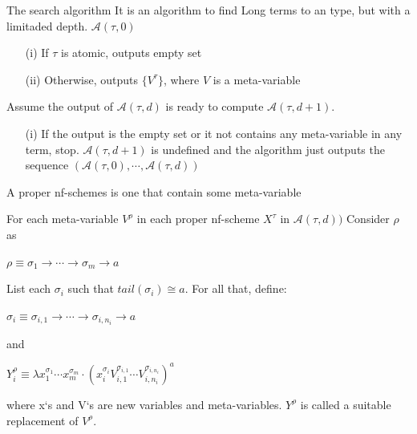 \begin{frame}{The search algorithm}
          It is an algorithm to find Long terms to an type, but with a
          limitaded depth.
          $\mathcal{A}(\tau,0)$

          \begin{itemize}
                 \item[(i)] If $\tau$ is atomic, outputs empty set

                 \item[(ii)] Otherwise, outputs $\{V^{\tau}\}$, where
                   $V$ is a meta-variable
          \end{itemize}
     
\end{frame}

\begin{frame}
          Assume the output of $\mathcal{A}(\tau,d)$ is ready to
          compute $\mathcal{A}(\tau,d+1)$.

          \begin{itemize}
                 \item[(i)] If the output is the empty set or it not
                   contains any meta-variable in any term,
                   stop. $\mathcal{A}(\tau,d+1)$ is undefined and the
                   algorithm just outputs the sequence
                   $(\mathcal{A}(\tau,0), \cdots, \mathcal{A}(\tau,d))$
          \end{itemize}
\end{frame}

\begin{frame}
      \begin{mydef}
            A proper nf-schemes is one that contain some meta-variable
      \end{mydef}

      For each meta-variable $V^{\rho}$ in each proper nf-scheme $X^{\tau}$ in
      $\mathcal{A}(\tau,d))$
      Consider $\rho$ as

      \begin{center}
            $\rho \equiv \sigma_1 \to \cdots \to \sigma_m \to a$
      \end{center}

      List each $\sigma_i$ such that $tail(\sigma_i) \cong a$. For all
      that, define:
      \begin{center}
            $\sigma_i \equiv \sigma_{i,1} \to \cdots \to \sigma_{i,n_i}
            \to a$
      \end{center}

      and
      
      \begin{center}
             $Y^{\rho}_i \equiv \lambda x^{\sigma_1}_1 \cdots
             x^{\sigma_m}_m \cdot (x^{\sigma_i}_i
             V^{\sigma_{i,1}}_{i,1} \cdots V^{\sigma_{i,n_i}}_{i,n_i})^a$
      \end{center}

      where x`s and V`s are new variables and
      meta-variables. $Y^{\rho}$ is called a suitable replacement of $V^{\rho}$.
\end{frame}

